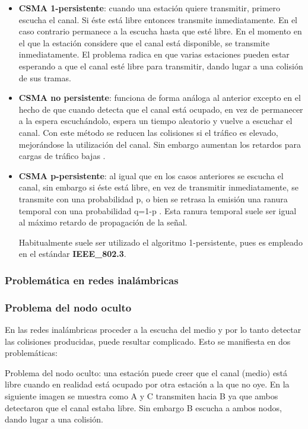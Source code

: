 \documentclass[a4paper]{article}
\begin{document}
	\begin{itemize}
		\item \textbf{CSMA 1-persistente}: cuando una estación quiere transmitir, primero escucha el canal. Si éste está libre entonces transmite inmediatamente. En el caso contrario permanece a la escucha hasta que esté libre. En el momento en el que la estación considere que el canal está disponible, se transmite inmediatamente. El problema radica en que varias estaciones pueden estar esperando a que el canal esté libre para transmitir, dando lugar a una colisión de sus tramas.
		
		\item \textbf{CSMA no persistente}: funciona de forma análoga al anterior excepto en el hecho de que cuando detecta que el canal está ocupado, en vez de permanecer a la espera escuchándolo, espera un tiempo aleatorio y vuelve a escuchar el canal. Con este método se reducen las colisiones si el tráfico es elevado, mejorándose la utilización del canal. Sin embargo aumentan los retardos para cargas de tráfico bajas .
		
		\item \textbf{CSMA p-persistente}: al igual que en los casos anteriores se escucha el canal, sin embargo si éste está libre, en vez de transmitir inmediatamente, se transmite con una probabilidad p, o bien se retrasa la emisión una ranura temporal con una probabilidad q=1-p . Esta ranura temporal suele ser igual al máximo retardo de propagación de la señal.
		
		Habitualmente suele ser utilizado el algoritmo 1-persistente, pues es empleado en el estándar \textbf{IEEE\_802.3}.
	\end{itemize}
	
	\subsubsection{Problemática en redes inalámbricas}
	
	\subsubsection*{Problema del nodo oculto}
	
	En las redes inalámbricas proceder a la escucha del medio y por lo tanto detectar las colisiones producidas, puede resultar complicado. Esto se manifiesta en dos problemáticas:
	
	Problema del nodo oculto: una estación puede creer que el canal (medio) está libre cuando en realidad está ocupado por otra estación a la que no oye. En la siguiente imagen se muestra como A y C transmiten hacia B ya que ambos detectaron que el canal estaba libre. Sin embargo B escucha a ambos nodos, dando lugar a una colisión.
	
\end{document}
